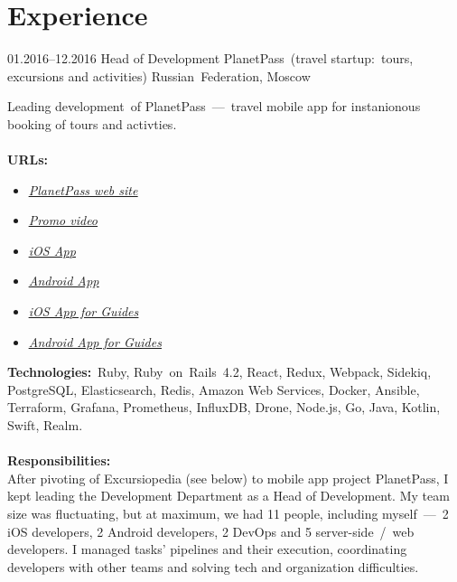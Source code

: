 \documentclass[12pt,a4paper,final]{moderncv}
\begin{document}
\section{Experience}

\cventry
{01.2016--12.2016}
{Head of Development}
{PlanetPass~(travel startup:~tours, excursions and activities)}
{Russian~Federation, Moscow}
{}
{
  Leading development~of PlanetPass~---~travel mobile app for instanionous booking of tours and activties.
  \\\\
  \textbf{URLs:}
  \begin{itemize}
    \item \underline{\href{https://planetpass.com}{\itshape PlanetPass web site}}
    \item \underline{\href{https://vimeo.com/176452074}{\itshape Promo video}}
    \item \underline{\href{https://itunes.apple.com/us/app/planetpass-city-walks-with-guides/id1087995218}{\itshape iOS App}}
    \item \underline{\href{https://play.google.com/store/apps/details?id=com.excursiopedia.planetpass}{\itshape Android App}}
    \item \underline{\href{https://itunes.apple.com/us/app/tool-for-guides/id1129160306}{\itshape iOS App for Guides}}
    \item \underline{\href{https://play.google.com/store/apps/details?id=com.excursiopedia.guide}{\itshape Android App for Guides}}
  \end{itemize}
  \bigskip
  \textbf{Technologies:}~Ruby, Ruby~on~Rails~4.2, React, Redux, Webpack, Sidekiq, PostgreSQL, Elasticsearch, Redis, Amazon Web Services, Docker, Ansible, Terraform, Grafana, Prometheus, InfluxDB, Drone, Node.js, Go, Java, Kotlin, Swift, Realm.
  \\\\
  \textbf{Responsibilities:}\\
  After pivoting of Excursiopedia (see below) to mobile app project PlanetPass, I kept leading the Development Department as a Head of Development. My team size was fluctuating, but at maximum, we had 11 people, including myself~---~2 iOS developers, 2 Android developers, 2 DevOps and 5 server-side~/~web developers. I managed tasks' pipelines and their execution, coordinating developers with other teams and solving tech and organization difficulties.
  \\\\
}
\end{document}
